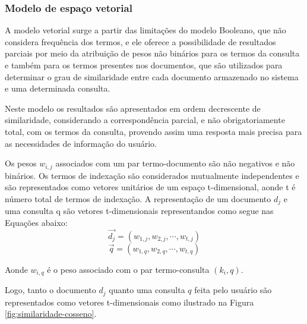 \subsubsection{Modelo de espaço vetorial} \label{subsubsec:Modelo-espaço-vetorial}



    A modelo vetorial surge a partir das limitações do modelo Booleano, que não considera frequência dos termos, e ele oferece a possibilidade de resultados parciais por meio da atribuição de pesos não binários para os termos da consulta e também para os termos presentes nos documentos, que são utilizados para determinar o grau de similaridade entre cada documento armazenado no sistema e uma determinada consulta.
    
    Neste modelo os resultados são apresentados em ordem decrescente de similaridade, considerando a correspondência parcial, e não obrigatoriamente total, com os termos da consulta, provendo assim uma resposta mais precisa para as necessidades de informação do usuário.
    
    Os pesos $w_{i,j}$ associados com um par termo-documento são não negativos e não binários. 
    Os termos de indexação são considerados mutualmente independentes e são representados como vetores unitários de um espaço t-dimensional, aonde t é número total de termos de indexação.
    A representação de um documento $d_j$ e uma consulta q são vetores t-dimensionais representandos como segue nas Equações abaixo:
    \begin{equation}
    			\vec{d_j} = (w_{1,j}, w_{2,j}, \cdots , w_{t,j})
    \end{equation}
    \begin{equation}
    			\vec{q} = (w_{1,q}, w_{2,q}, \cdots , w_{t,q})
    \end{equation}
    
    Aonde $w_{i,q}$ é o peso associado com o par termo-consulta $(k_i, q)$.
    
    Logo, tanto o documento $d_j$ quanto uma consulta $q$ feita pelo usuário são representados como vetores t-dimensionais como ilustrado na Figura \ref{fig:similaridade-cosseno}. 
    
